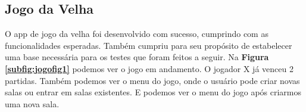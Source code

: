 \documentclass[12pt]{article}
\begin{document}
\subsection{Jogo da Velha}
O app de jogo da velha foi desenvolvido com sucesso, cumprindo com as funcionalidades esperadas. Também cumpriu para seu propósito de estabelecer uma base necessária para os testes que foram feitos a seguir.
Na {\bf Figura \ref{subfig:jogofig1}} podemos ver o jogo em andamento. O jogador X já venceu 2 partidas. Também podemos ver o menu do jogo, onde o usuário pode criar novas salas ou entrar em salas existentes. E podemos ver o menu do jogo após criarmos uma nova sala.
\begin{figure}[h]
  
  \hfill

\end{figure}
\end{document}

